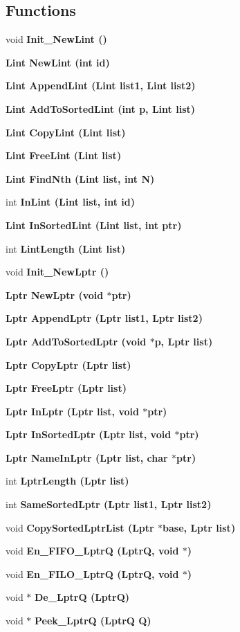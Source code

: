 \subsection*{Functions}
\begin{CompactItemize}
\item 
void \bf{Init\_\-New\-Lint} ()
\item 
\bf{Lint} \bf{New\-Lint} (int id)
\item 
\bf{Lint} \bf{Append\-Lint} (\bf{Lint} list1, \bf{Lint} list2)
\item 
\bf{Lint} \bf{Add\-To\-Sorted\-Lint} (int p, \bf{Lint} \bf{list})
\item 
\bf{Lint} \bf{Copy\-Lint} (\bf{Lint} \bf{list})
\item 
\bf{Lint} \bf{Free\-Lint} (\bf{Lint} \bf{list})
\item 
\bf{Lint} \bf{Find\-Nth} (\bf{Lint} \bf{list}, int N)
\item 
int \bf{In\-Lint} (\bf{Lint} \bf{list}, int id)
\item 
\bf{Lint} \bf{In\-Sorted\-Lint} (\bf{Lint} \bf{list}, int ptr)
\item 
int \bf{Lint\-Length} (\bf{Lint} \bf{list})
\item 
void \bf{Init\_\-New\-Lptr} ()
\item 
\bf{Lptr} \bf{New\-Lptr} (void $\ast$ptr)
\item 
\bf{Lptr} \bf{Append\-Lptr} (\bf{Lptr} list1, \bf{Lptr} list2)
\item 
\bf{Lptr} \bf{Add\-To\-Sorted\-Lptr} (void $\ast$p, \bf{Lptr} \bf{list})
\item 
\bf{Lptr} \bf{Copy\-Lptr} (\bf{Lptr} \bf{list})
\item 
\bf{Lptr} \bf{Free\-Lptr} (\bf{Lptr} \bf{list})
\item 
\bf{Lptr} \bf{In\-Lptr} (\bf{Lptr} \bf{list}, void $\ast$ptr)
\item 
\bf{Lptr} \bf{In\-Sorted\-Lptr} (\bf{Lptr} \bf{list}, void $\ast$ptr)
\item 
\bf{Lptr} \bf{Name\-In\-Lptr} (\bf{Lptr} \bf{list}, char $\ast$ptr)
\item 
int \bf{Lptr\-Length} (\bf{Lptr} \bf{list})
\item 
int \bf{Same\-Sorted\-Lptr} (\bf{Lptr} list1, \bf{Lptr} list2)
\item 
void \bf{Copy\-Sorted\-Lptr\-List} (\bf{Lptr} $\ast$base, \bf{Lptr} \bf{list})
\item 
void \bf{En\_\-FIFO\_\-Lptr\-Q} (\bf{Lptr\-Q}, void $\ast$)
\item 
void \bf{En\_\-FILO\_\-Lptr\-Q} (\bf{Lptr\-Q}, void $\ast$)
\item 
void $\ast$ \bf{De\_\-Lptr\-Q} (\bf{Lptr\-Q})
\item 
void $\ast$ \bf{Peek\_\-Lptr\-Q} (\bf{Lptr\-Q} Q)
\end{CompactItemize}
